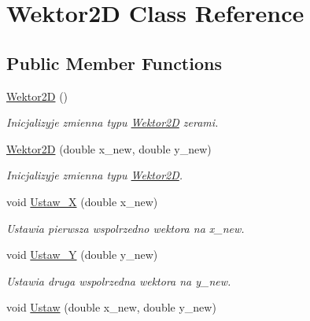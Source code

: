 \hypertarget{class_wektor2_d}{\section{Wektor2\+D Class Reference}
\label{class_wektor2_d}
}
\subsection*{Public Member Functions}
\begin{DoxyCompactItemize}
\item 
\hypertarget{class_wektor2_d_a0033c26592fddb39e1ae856f1356934c}{\hyperlink{class_wektor2_d_a0033c26592fddb39e1ae856f1356934c}{Wektor2\+D} ()}\label{class_wektor2_d_a0033c26592fddb39e1ae856f1356934c}

\begin{DoxyCompactList}\small\item\em Inicjalizyje zmienna typu \hyperlink{class_wektor2_d}{Wektor2\+D} zerami. \end{DoxyCompactList}\item 
\hyperlink{class_wektor2_d_a731c3a68d9c7d209cc4d130e7d26b488}{Wektor2\+D} (double x\+\_\+new, double y\+\_\+new)
\begin{DoxyCompactList}\small\item\em Inicjalizyje zmienna typu \hyperlink{class_wektor2_d}{Wektor2\+D}. \end{DoxyCompactList}\item 
\hypertarget{class_wektor2_d_a1335fe5aa19f0d521a0c87857ba42f65}{void \hyperlink{class_wektor2_d_a1335fe5aa19f0d521a0c87857ba42f65}{Ustaw\+\_\+\+X} (double x\+\_\+new)}\label{class_wektor2_d_a1335fe5aa19f0d521a0c87857ba42f65}

\begin{DoxyCompactList}\small\item\em Ustawia pierwsza wspolrzedno wektora na x\+\_\+new. \end{DoxyCompactList}\item 
\hypertarget{class_wektor2_d_aa94255dc07581b89f76145869d8619db}{void \hyperlink{class_wektor2_d_aa94255dc07581b89f76145869d8619db}{Ustaw\+\_\+\+Y} (double y\+\_\+new)}\label{class_wektor2_d_aa94255dc07581b89f76145869d8619db}

\begin{DoxyCompactList}\small\item\em Ustawia druga wspolrzedna wektora na y\+\_\+new. \end{DoxyCompactList}\item 
\hypertarget{class_wektor2_d_a33026b3a205d6e3f66c25c2e6e241a71}{void \hyperlink{class_wektor2_d_a33026b3a205d6e3f66c25c2e6e241a71}{Ustaw} (double x\+\_\+new, double y\+\_\+new)}\label{class_wektor2_d_a33026b3a205d6e3f66c25c2e6e241a71}


\end{DoxyCompactItemize}
